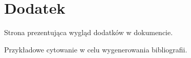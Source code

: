 \chapter{Dodatek}
\label{app:dodatek}
\thispagestyle{appendixStyle}

Strona prezentująca wygląd dodatków w dokumencie.

Przykładowe cytowanie \cite{Ahuja:1993:NFT:137406} w celu wygenerowania bibliografii.